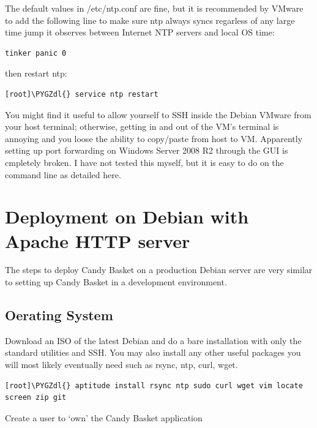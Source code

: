\documentclass[letterpaper,10pt,english]{sphinxmanual}
\def\PYGZdl{\char`\$}
\begin{document}
The default values in /etc/ntp.conf are fine, but it is recommended by
VMware to add the following line to make sure ntp always syncs
regarless of any large time jump it observes between Internet NTP
servers and local OS time:

\begin{Verbatim}[commandchars=\\\{\}]
tinker panic 0
\end{Verbatim}

then restart ntp:

\begin{Verbatim}[commandchars=\\\{\}]
[root]\PYGZdl{} service ntp restart
\end{Verbatim}

You might find it useful to allow yourself to SSH inside the Debian
VMware from your host terminal; otherwise, getting in and out of the
VM's terminal is annoying and you loose the ability to copy/paste from
host to VM. Apparently setting up port forwarding on Windows Server
2008 R2 through the GUI is cmpletely broken. I have not tested this
myself, but it is easy to do on the command line as detailed here.


\section{Deployment on Debian with Apache HTTP server}
\label{administrator-guide:deployment-on-debian-with-apache-http-server}\label{administrator-guide:deploy-debian-apache}
The steps to deploy Candy Basket on a production Debian server are
very similar to setting up Candy Basket in a development environment.


\subsection{Oerating System}
\label{administrator-guide:oerating-system}
Download an ISO of the latest Debian and do a bare installation with
only the standard utilities and SSH. You may also install any other
useful packages you will most likely eventually need such as rsync,
ntp, curl, wget.

\begin{Verbatim}[commandchars=\\\{\}]
[root]\PYGZdl{} aptitude install rsync ntp sudo curl wget vim locate screen zip git
\end{Verbatim}

Create a user to `own' the Candy Basket application
\end{document}
